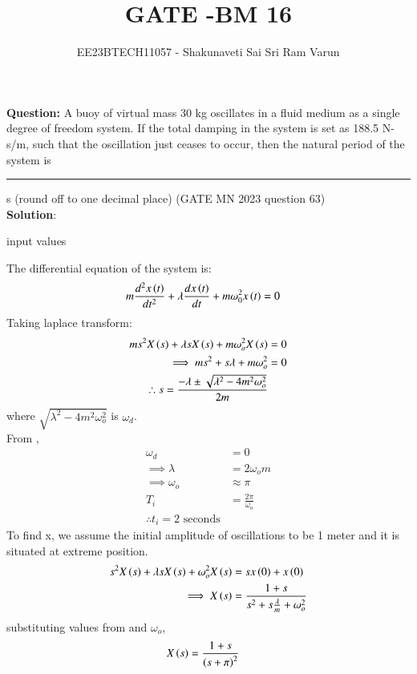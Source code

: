 \documentclass[journal,12pt,twocolumn]{IEEEtran}
\theoremstyle{remark}
\begin{document}

\vspace{3cm}

\title{GATE -BM 16}
\author{EE23BTECH11057 - Shakunaveti Sai Sri Ram Varun$^{}$%
}
\maketitle
\newpage
\bigskip
\vspace{2cm}
\textbf{Question: }
A buoy of virtual mass 30 kg oscillates in a fluid medium as a single degree of
freedom system. If the total damping in the system is set as 188.5 N-s/m, such
that the oscillation just ceases to occur, then the natural period of the system is
\rule{1cm}{0.15mm} s (round off to one decimal place)
\hfill(GATE MN 2023 question 63)\\

\textbf{Solution}:\\
\begin{table}[h!] 
\centering

\caption{input values}
\label{tab: Table mn63}
\end{table}

The differential equation of the system is:
\begin{align}
m\frac{d^2x\left(t\right)}{dt^2} + \lambda \frac{dx\left(t\right)}{dt} + m\omega_0^2 x\left(t\right) &= 0
\end{align}
Taking laplace transform:
\begin{align}
ms^2X\left(s\right) + \lambda s X\left(s\right) + m\omega_o^2 X\left(s\right)&=0\\
\implies ms^2 + s\lambda + m\omega_o^2 &=0\\
\therefore s = \frac{-\lambda \pm \sqrt{\lambda^2 - 4 m^2 \omega_o^2}}{2m}
\end{align}
where $ \sqrt{\lambda^2 - 4 m^2 \omega_o^2}$ is $ \omega_d$.\\
From ,
\begin{align}
\omega_d &=0\\
\implies \lambda &= 2\omega_o m\\
\implies \omega_o &\approx \pi\\
 T_i &= \frac{2\pi}{\omega_o}\\
 \therefore t_i = 2\text{ seconds}
\end{align}
To find x, we assume the initial amplitude of oscillations to be 1 meter and it is situated at extreme position.
\begin{align}
s^2X\left(s\right) + \lambda s X\left(s\right) + \omega_o^2 X\left(s\right)&=sx\left(0\right)+x\left(0\right)\\
\implies X\left(s\right)&=\frac{1+s}{s^2 + s\frac{\lambda}{m} + \omega_o^2}
\end{align}
substituting values from  and $\omega_o$,
\begin{align}
X\left(s\right) &= \frac{1+s}{\left(s+\pi\right)^2}
\end{align}
\vspace{3cm}
\end{document}
